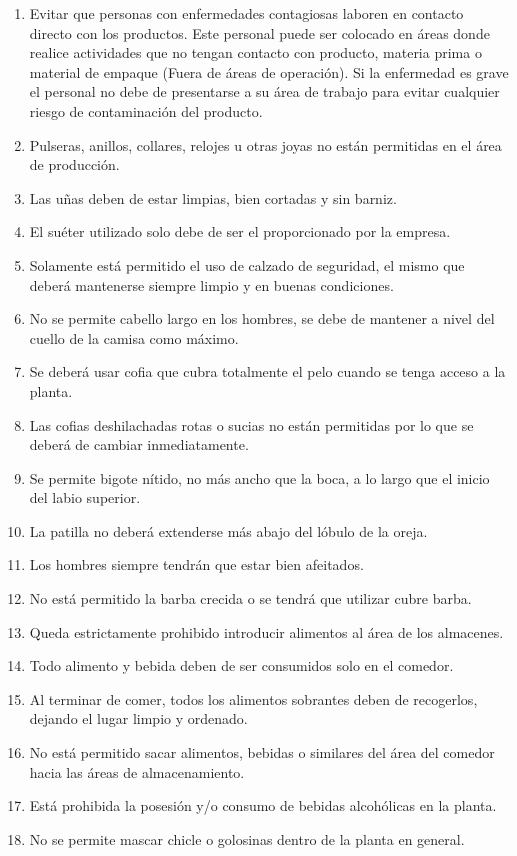 \begin{enumerate}
	\item Evitar que personas con enfermedades contagiosas laboren en contacto directo con los productos. Este personal puede ser colocado en áreas donde realice actividades que no tengan contacto con producto, materia prima o material de empaque (Fuera de áreas de operación). Si la enfermedad es grave el personal no debe de presentarse a su área de trabajo para evitar cualquier riesgo de contaminación del producto.
	\item Pulseras, anillos, collares, relojes u otras joyas no están permitidas en el área de producción.
	\item Las uñas deben de estar limpias, bien cortadas y sin barniz.
	\item El suéter utilizado solo debe de ser el proporcionado por la empresa.
	\item Solamente está permitido el uso de calzado de seguridad, el mismo que deberá mantenerse siempre limpio y en buenas condiciones.
	\item No se permite cabello largo en los hombres, se debe de mantener a nivel del cuello de la camisa como máximo.
	\item Se deberá usar cofia que cubra totalmente el pelo cuando se tenga acceso a la planta.
	\item Las cofias deshilachadas rotas o sucias no están permitidas por lo que se deberá de cambiar inmediatamente.
	\item Se permite bigote nítido, no más ancho que la boca, a lo largo que el inicio del labio superior.
	\item La patilla no deberá extenderse más abajo del lóbulo de la oreja.
	\item Los hombres siempre tendrán que estar bien afeitados.
	\item No está permitido la barba crecida o se tendrá que utilizar cubre barba.
	\item Queda estrictamente prohibido introducir alimentos al área de los almacenes.
	\item Todo alimento y bebida deben de ser consumidos solo en el comedor.
	\item Al terminar de comer, todos los alimentos sobrantes deben de recogerlos, dejando el lugar limpio y ordenado.
	\item No está permitido sacar alimentos, bebidas o similares del área del comedor hacia las áreas de almacenamiento.
	\item Está prohibida la posesión y/o consumo de bebidas alcohólicas en la planta.
	\item No se permite mascar chicle o golosinas dentro de la planta en general.

\end{enumerate}
